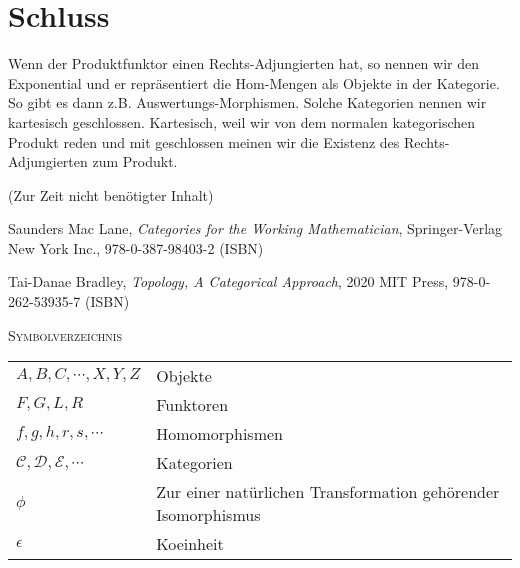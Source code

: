 \documentclass[a4paper]{amsart}
\theoremstyle{definition}
\begin{document}
\section{Schluss}
Wenn der Produktfunktor einen Rechts-Adjungierten hat, so nennen wir den Exponential und er repräsentiert die Hom-Mengen als Objekte in der Kategorie. So gibt es dann z.B. Auswertungs-Morphismen. Solche Kategorien nennen wir kartesisch geschlossen. Kartesisch, weil wir von dem normalen kategorischen Produkt reden und mit geschlossen meinen wir die Existenz des Rechts-Adjungierten zum Produkt.

\begin{backup}
    (Zur Zeit nicht benötigter Inhalt)
\end{backup}

\begin{thebibliography}{9}

      Saunders Mac Lane, \emph{Categories for the Working Mathematician},
      Springer-Verlag New York Inc., 978-0-387-98403-2 (ISBN)
      
      Tai-Danae Bradley, \emph{Topology, A Categorical Approach},
      2020 MIT Press, 978-0-262-53935-7 (ISBN)
      
\end{thebibliography}

\begin{large}
    \centerline{\textsc{Symbolverzeichnis}}
\end{large}
\bigskip

\renewcommand*{\arraystretch}{1}

\begin{tabular}{ll}
    $A, B, C, \cdots, X, Y, Z$          & Objekte\\
    $F,G,L,R$ & Funktoren\\
    $f, g, h, r, s, \cdots$   & Homomorphismen\\
    $\mathcal C, \mathcal D, \mathcal E, \cdots$ & Kategorien\\
    $\phi$         &Zur einer natürlichen Transformation gehörender Isomorphismus\\
    $\epsilon$ &Koeinheit
\end{tabular}
\end{document}

